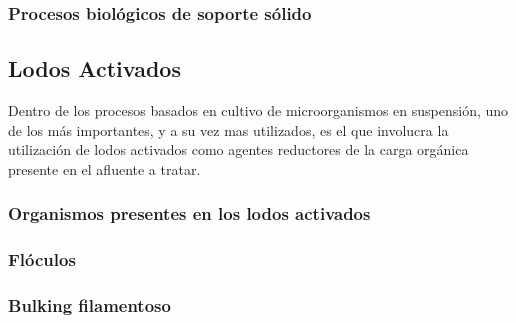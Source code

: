 \subsubsection*{Procesos biológicos de soporte sólido}
\subsection{Lodos Activados}
Dentro de los procesos basados en cultivo de microorganismos en suspensión, uno de los más importantes, y a su vez mas utilizados, es el que involucra la utilización de lodos activados como agentes reductores de la carga orgánica presente en el afluente a tratar.
\subsubsection{Organismos presentes en los lodos activados}
\subsubsection{Flóculos}
\subsubsection{Bulking filamentoso}

